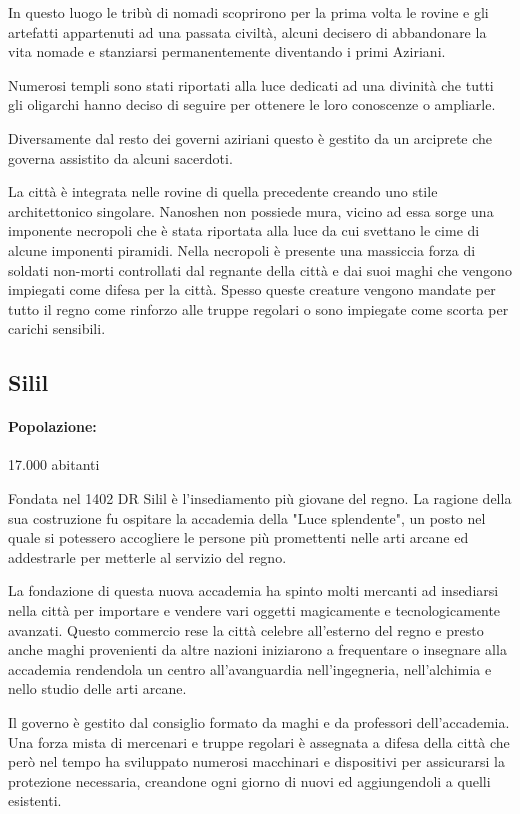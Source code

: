 \documentclass[letterpaper,twocolumn,openany,nodeprecatedcode]{dndbook}
\begin{document}
In questo luogo le tribù di nomadi scoprirono per la prima volta le rovine e gli artefatti appartenuti ad una passata civiltà, alcuni decisero di abbandonare la vita nomade e stanziarsi permanentemente diventando i primi Aziriani.

Numerosi templi sono stati riportati alla luce dedicati ad una divinità che tutti gli oligarchi hanno deciso di seguire per ottenere le loro conoscenze o ampliarle.

Diversamente dal resto dei governi aziriani questo è gestito da un arciprete che governa assistito da alcuni sacerdoti.

La città è integrata nelle rovine di quella precedente creando uno stile architettonico singolare. Nanoshen non possiede mura, vicino ad essa sorge una imponente necropoli che è stata riportata alla luce da cui svettano le cime di alcune imponenti piramidi. Nella necropoli è presente una massiccia forza di soldati non-morti controllati dal regnante della città e dai suoi maghi che vengono impiegati come difesa per la città. Spesso queste creature vengono mandate per tutto il regno come rinforzo alle truppe regolari o sono impiegate come scorta per carichi sensibili.

\subsection{Silil}
\paragraph{Popolazione:} 17.000 abitanti

Fondata nel 1402 DR Silil è l'insediamento più giovane del regno. La ragione della sua costruzione fu ospitare la accademia della "Luce splendente", un posto nel quale si potessero accogliere le persone più promettenti nelle arti arcane ed addestrarle per metterle al servizio del regno.

La fondazione di questa nuova accademia ha spinto molti mercanti ad insediarsi nella città per importare e vendere vari oggetti magicamente e tecnologicamente avanzati. Questo commercio rese la città celebre all'esterno del regno e presto anche maghi provenienti da altre nazioni iniziarono a frequentare o insegnare alla accademia rendendola un centro all'avanguardia nell'ingegneria, nell'alchimia e nello studio delle arti arcane.

Il governo è gestito dal consiglio formato da maghi e da professori dell'accademia. Una forza mista di mercenari e truppe regolari è assegnata a difesa della città che però nel tempo ha sviluppato numerosi macchinari e dispositivi per assicurarsi la protezione necessaria, creandone ogni giorno di nuovi ed aggiungendoli a quelli esistenti.
\end{document}
